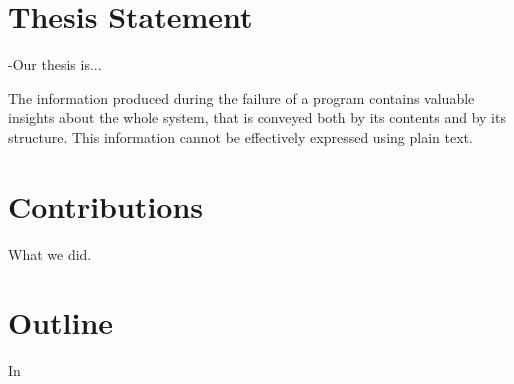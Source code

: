 


\section{Thesis Statement}\label{sec:thesis}

-Our thesis is...

\begin{framed}
The information produced during the failure of a program contains valuable insights about the whole system, that is conveyed both by its contents and by its structure.
This information cannot be effectively expressed using plain text.
\end{framed}


\section{Contributions}

What we did.


\section{Outline}

In 
